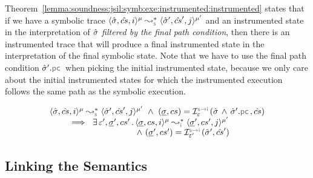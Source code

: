 Theorem~\ref{lemma:soundness:jsil:symb:exe:instrumented:instrumented} states 
that if we have a symbolic trace $\transabssemrule{\sstate, \scs, i}{\sstate', \scs', j}{\mode}{\mode'}{\symbolic}$
 and an instrumented state in the interpretation of $\hat{\sigma}$ \emph{filtered by the final 
 path condition}, then there is an instrumented trace that will produce a final instrumented state 
 in the interpretation of the final symbolic state. 
 Note that we have to use the final path condition $\sstate'.\pcsel$ when picking the initial 
 instrumented state, because we only care about the initial instrumented states for which 
the instrumented execution follows the same path as the symbolic execution. 



\begin{theorem}\label{lemma:soundness:jsil:symb:exe:instrumented:instrumented}
$$
\begin{array}{l}
\transabssemrule{\sstate, \scs, i}{\sstate', \scs', j}{\mode}{\mode'}{\symbolic}  \ \wedge \ (\istate, \cs) = \interpret{\symbinst}{\senv}(\sstate \, \wedge \, \sstate'.\pcsel, \scs) \\ \quad \quad 
    \ \implies \ \exists \, \senv', \istate', \cs' \, . \, 
        \transabssemrule{\istate, \cs, i}{\istate', \cs', j}{\mode}{\mode'}{\instrumented} \\ \quad \quad \quad \quad  \quad \quad \quad \quad  \quad \quad
             \ \wedge \ (\istate', \cs') = \interpret{\symbinst}{\senv'}(\sstate', \scs')
\end{array}
$$
\end{theorem}





\subsection{Linking the Semantics}\label{sex:formal:guarantees}

